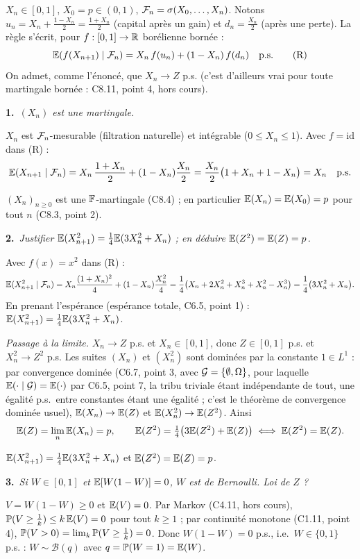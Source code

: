 \documentclass[11pt,a4paper]{article}
\newcommand{\question}[2]{\par\medskip\noindent\textbf{#1}~\textit{#2}\par\smallskip}
\begin{document}
\begin{exo}
$X_n\in[0,1]$, $X_0=p\in(0,1)$, $\mathcal{F}_n=\sigma(X_0,\dots,X_n)$. Notons $u_n=X_n+\frac{1-X_n}2=\frac{1+X_n}2$ (capital après un gain) et
$d_n=\frac{X_n}2$ (après une perte). La règle s'écrit, pour $f:[0,1]\to\mathbb{R}$ borélienne bornée :
\[\mathbb{E}(f(X_{n+1})\mid\mathcal{F}_n)=X_n\,f(u_n)+(1-X_n)\,f(d_n)\quad\text{p.s.}\tag{R}\]
On admet, comme l'énoncé, que $X_n\to Z$ p.s. (c'est d'ailleurs vrai pour toute martingale bornée : C8.11, point 4, hors cours).

\question{1.}{$(X_n)$ est une martingale.}
$X_n$ est $\mathcal{F}_n$-mesurable (filtration naturelle) et intégrable ($0\le X_n\le1$). Avec $f=\mathrm{id}$ dans (R) :
\[\mathbb{E}(X_{n+1}\mid\mathcal{F}_n)=X_n\,\frac{1+X_n}2+(1-X_n)\frac{X_n}2=\frac{X_n}2\bigl(1+X_n+1-X_n\bigr)=X_n\quad\text{p.s.}\]
\begin{resultat}$(X_n)_{n\ge0}$ est une $\mathbb{F}$-martingale (C8.4) ; en particulier $\mathbb{E}(X_n)=\mathbb{E}(X_0)=p$ pour tout $n$ (C8.3, point 2).\end{resultat}

\question{2.}{Justifier $\mathbb{E}(X_{n+1}^2)=\frac14\mathbb{E}(3X_n^2+X_n)$ ; en déduire $\mathbb{E}(Z^2)=\mathbb{E}(Z)=p$.}
Avec $f(x)=x^2$ dans (R) :
\[\mathbb{E}(X_{n+1}^2\mid\mathcal{F}_n)=X_n\frac{(1+X_n)^2}4+(1-X_n)\frac{X_n^2}4=\frac14\bigl(X_n+2X_n^2+X_n^3+X_n^2-X_n^3\bigr)=\frac14\bigl(3X_n^2+X_n\bigr).\]
En prenant l'espérance (espérance totale, C6.5, point 1) : $\mathbb{E}(X_{n+1}^2)=\frac14\mathbb{E}(3X_n^2+X_n)$.

\emph{Passage à la limite.} $X_n\to Z$ p.s. et $X_n\in[0,1]$, donc $Z\in[0,1]$ p.s. et $X_n^2\to Z^2$ p.s. Les suites $(X_n)$ et $(X_n^2)$ sont
dominées par la constante $1\in L^1$ : par convergence dominée (C6.7, point 3, avec $\mathcal{G}=\{\emptyset,\Omega\}$, pour laquelle
$\mathbb{E}(\cdot\mid\mathcal{G})=\mathbb{E}(\cdot)$ par C6.5, point 7, la tribu triviale étant indépendante de tout, une égalité p.s.\ entre constantes étant une égalité ; c'est le théorème de convergence dominée usuel), $\mathbb{E}(X_n)\to\mathbb{E}(Z)$ et $\mathbb{E}(X_n^2)\to\mathbb{E}(Z^2)$. Ainsi
\[\mathbb{E}(Z)=\lim_n\mathbb{E}(X_n)=p,\qquad \mathbb{E}(Z^2)=\tfrac14\bigl(3\mathbb{E}(Z^2)+\mathbb{E}(Z)\bigr)\iff\mathbb{E}(Z^2)=\mathbb{E}(Z).\]
\begin{resultat}$\mathbb{E}(X_{n+1}^2)=\frac14\mathbb{E}(3X_n^2+X_n)$ et $\mathbb{E}(Z^2)=\mathbb{E}(Z)=p$.\end{resultat}

\question{3.}{Si $W\in[0,1]$ et $\mathbb{E}[W(1-W)]=0$, $W$ est de Bernoulli. Loi de $Z$ ?}
$V=W(1-W)\ge0$ et $\mathbb{E}(V)=0$. Par Markov (C4.11, hors cours), $\mathbb{P}(V\ge\frac1k)\le k\,\mathbb{E}(V)=0$ pour tout $k\ge1$ ; par continuité
monotone (C1.11, point 4), $\mathbb{P}(V>0)=\lim_k\mathbb{P}(V\ge\frac1k)=0$. Donc $W(1-W)=0$ p.s., i.e.\ $W\in\{0,1\}$ p.s. : $W\sim\mathcal B(q)$
avec $q=\mathbb{P}(W=1)=\mathbb{E}(W)$.


\end{exo}
\end{document}
